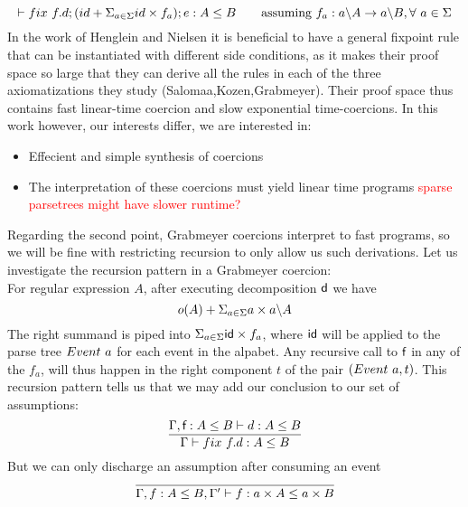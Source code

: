 \documentclass[a4paper,UKenglish,cleveref, autoref, thm-restate]{lipics-v2021}
\newcommand\mycomment[1]{\textcolor{red}{#1}}
\begin{document}
\[
\contains{}{\fix ~f.d;(id + \Sigma_{a \in \Sigma} id\times f_a); e}{A}{B} \qquad \text{assuming }f_a : \derive{a}{A} \rightarrow \derive{a}{B}, \forall ~ a \in \Sigma \]
In the work of Henglein and Nielsen it is beneficial to have a general fixpoint rule that can be instantiated with different side conditions, as it makes their proof space so large that they can derive all the rules in each of the three axiomatizations they study (Salomaa,Kozen,Grabmeyer). Their proof space thus contains fast linear-time coercion and slow exponential time-coercions. In this work however, our interests differ, we are interested in:
\begin{itemize}
\item Effecient and simple synthesis of coercions
\item The interpretation of these coercions must yield linear time programs \mycomment{sparse parsetrees might have slower runtime?}
\end{itemize}
Regarding the second point, Grabmeyer coercions interpret to fast programs, so we will be fine with restricting recursion to only allow us such derivations. Let us investigate the recursion pattern in a Grabmeyer coercion:\\
For regular expression $A$, after executing decomposition $\textsf{d}$ we have 
 \[ o(A) + \Sigma_{a \in \Sigma} a\times a \backslash A \]
 The right summand is piped into $\Sigma_{a \in \Sigma} \textsf{id}\times f_a$, where $\textsf{id}$ will be applied to the parse tree $\event{a}$ for each event in the alpabet. Any recursive call to $\textsf{f}$ in any of the $f_a$, will thus happen in the right component $t$ of the pair $(\event{a},t)$. 
This recursion pattern tells us that we may add our conclusion to our set of assumptions:
\[\infer{\contains{\Gamma}{\fix ~f.d}{A}{B}}{ \contains{\Gamma, \dslcom{f}: A \leq B}{d}{A}{B}}
\]
But we can only discharge an assumption after consuming an event
\[\infer{\contains{\Gamma, f : A \leq B, \Gamma'}{f}{a \times A}{a \times B}}{}
\]
\end{document}
